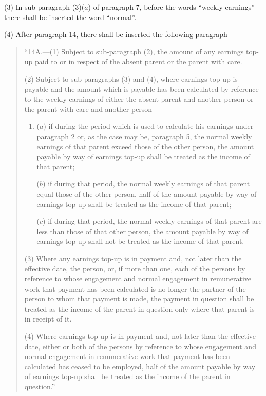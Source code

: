 \documentclass[a4paper]{article}
\begin{document}
(3) In sub-paragraph (3)($a$) of paragraph 7, before the words “weekly earnings” there shall be inserted the word “normal”.

(4) After paragraph 14, there shall be inserted the following paragraph—
\begin{quotation}
“14A.—(1) Subject to sub-paragraph (2), the amount of any earnings top-up paid to or in respect of the absent parent or the parent with care.

(2) Subject to sub-paragraphs (3) and (4), where earnings top-up is payable and the amount which is payable has been calculated by reference to the weekly earnings of either the absent parent and another person or the parent with care and another person—
\begin{enumerate}\item[]
($a$) if during the period which is used to calculate his earnings under paragraph 2 or, as the case may be, paragraph 5, the normal weekly earnings of that parent exceed those of the other person, the amount payable by way of earnings top-up shall be treated as the income of that parent;

($b$) if during that period, the normal weekly earnings of that parent equal those of the other person, half of the amount payable by way of earnings top-up shall be treated as the income of that parent;

($c$) if during that period, the normal weekly earnings of that parent are less than those of that other person, the amount payable by way of earnings top-up shall not be treated as the income of that parent.
\end{enumerate}

(3) Where any earnings top-up is in payment and, not later than the effective date, the person, or, if more than one, each of the persons by reference to whose engagement and normal engagement in remunerative work that payment has been calculated is no longer the partner of the person to whom that payment is made, the payment in question shall be treated as the income of the parent in question only where that parent is in receipt of it.

(4) Where earnings top-up is in payment and, not later than the effective date, either or both of the persons by reference to whose engagement and normal engagement in remunerative work that payment has been calculated has ceased to be employed, half of the amount payable by way of earnings top-up shall be treated as the income of the parent in question.”
\end{quotation}
\end{document}
